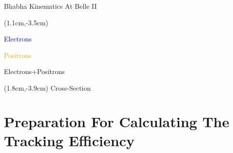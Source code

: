 \documentclass[8pt]{beamer}
\begin{document}
\begin{frame}{Bhabha Kinematics At Belle II}

	
	

\begin{textblock*}{4cm}(1.1cm,-3.5cm)
	\small{
	\textcolor{blue}{Electrons}
	
	\textcolor{orange}{Positrons}
		
	\textcolor{OliveGreen}{Electrons+Positrons}
}
\end{textblock*}


\begin{textblock*}{4cm}(1.8cm,-3.9cm)
	Cross-Section
\end{textblock*}






\end{frame}





\section{Preparation For Calculating The Tracking Efficiency}
\end{document}
